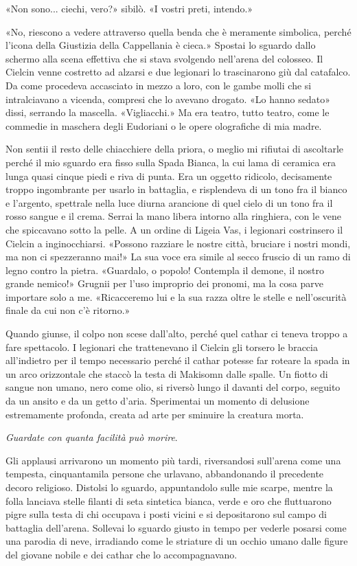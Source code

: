 «Non sono... ciechi, vero?» sibilò. «I vostri preti, intendo.»

«No, riescono a vedere attraverso quella benda che è meramente
simbolica, perché l'icona della Giustizia della Cappellania è cieca.»
Spostai lo sguardo dallo schermo alla scena effettiva che si stava
svolgendo nell'arena del colosseo. Il Cielcin venne costretto ad alzarsi
e due legionari lo trascinarono giù dal catafalco. Da come procedeva
accasciato in mezzo a loro, con le gambe molli che si intralciavano a
vicenda, compresi che lo avevano drogato. «Lo hanno sedato» dissi,
serrando la mascella. «Vigliacchi.» Ma era teatro, tutto teatro, come le
commedie in maschera degli Eudoriani o le opere olografiche di mia
madre.

Non sentii il resto delle chiacchiere della priora, o meglio mi rifiutai
di ascoltarle perché il mio sguardo era fisso sulla Spada Bianca, la cui
lama di ceramica era lunga quasi cinque piedi e riva di punta. Era un
oggetto ridicolo, decisamente troppo ingombrante per usarlo in
battaglia, e risplendeva di un tono fra il bianco e l'argento, spettrale
nella luce diurna arancione di quel cielo di un tono fra il rosso sangue
e il crema. Serrai la mano libera intorno alla ringhiera, con le vene
che spiccavano sotto la pelle. A un ordine di Ligeia Vas, i legionari
costrinsero il Cielcin a inginocchiarsi. «Possono razziare le nostre
città, bruciare i nostri mondi, ma non ci spezzeranno mai!» La sua voce
era simile al secco fruscio di un ramo di legno contro la pietra.
«Guardalo, o popolo! Contempla il demone, il nostro grande nemico!»
Grugnii per l'uso improprio dei pronomi, ma la cosa parve importare solo
a me. «Ricacceremo lui e la sua razza oltre le stelle e nell'oscurità
finale da cui non c'è ritorno.»

Quando giunse, il colpo non scese dall'alto, perché quel cathar ci
teneva troppo a fare spettacolo. I legionari che trattenevano il Cielcin
gli torsero le braccia all'indietro per il tempo necessario perché il
cathar potesse far roteare la spada in un arco orizzontale che staccò la
testa di Makisomn dalle spalle. Un fiotto di sangue non umano, nero come
olio, si riversò lungo il davanti del corpo, seguito da un ansito e da
un getto d'aria. Sperimentai un momento di delusione estremamente
profonda, creata ad arte per sminuire la creatura morta.

\emph{Guardate con quanta facilità può morire}.

Gli applausi arrivarono un momento più tardi, riversandosi sull'arena
come una tempesta, cinquantamila persone che urlavano, abbandonando il
precedente decoro religioso. Distolsi lo sguardo, appuntandolo sulle mie
scarpe, mentre la folla lanciava stelle filanti di seta sintetica
bianca, verde e oro che fluttuarono pigre sulla testa di chi occupava i
posti vicini e si depositarono sul campo di battaglia dell'arena.
Sollevai lo sguardo giusto in tempo per vederle posarsi come una parodia
di neve, irradiando come le striature di un occhio umano dalle figure
del giovane nobile e dei cathar che lo accompagnavano.

